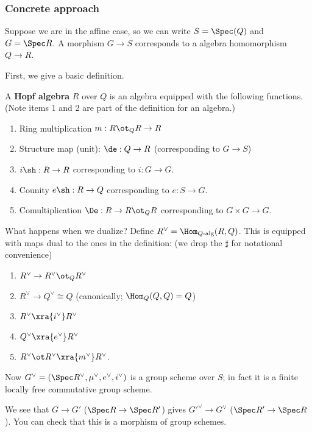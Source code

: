 \subsubsection{Concrete approach}
Suppose we are in the affine case, so we can write $S=\Spec(Q)$ and $G=\Spec R$. A morphism $G\to S$ corresponds to a algebra homomorphism $Q\to R$.

First, we give a basic definition.
\begin{df}
A \textbf{Hopf algebra}  $R$ over $Q$ is an algebra equipped with the following functions. (Note items 1 and 2 are part of the definition for an algebra.)
\begin{enumerate}
\item
Ring multiplication $m:R\ot_Q R\to R$
\item
Structure map (unit): $\de:Q\to R$ (corresponding to $G\to S$)
\item $i\sh: R\to R$ corresponding to $i:G\to G$.
\item Counity $e\sh: R\to Q$ corresponding to $e:S \to G$.
\item Comultiplication $\De:R\to R\ot_Q R$ corresponding to $G\times G\to G$.
\end{enumerate}
\end{df}
What happens when we dualize? Define $R^{\vee}=\Hom_{Q\text{-alg}}(R,Q)$. This is equipped with maps dual to the ones in the definition: (we drop the $\sharp$ for notational convenience)
\begin{enumerate}
\item $R^{\vee}\to R^{\vee}\ot_QR^{\vee}$
\item $R^{\vee}\to Q^{\vee}\cong Q$ (canonically; $\Hom_Q(Q,Q)=Q$)
\item $R^{\vee}\xra{i^{\vee}} R^{\vee}$
\item $Q^{\vee}\xra{e^{\vee}} R^{\vee}$
\item $R^{\vee}\ot R^{\vee}\xra{m^{\vee}} R^{\vee}$.
\end{enumerate}
Now $G^{\vee}=(\Spec R^{\vee}, \mu^{\vee}, e^{\vee},i^{\vee})$ is a group scheme over $S$; in fact it is a finite locally free commutative group scheme. 

We see that $G\to G'$ ($\Spec R\to \Spec R'$) gives $G'^{\vee}\to G^{\vee}$ ($\Spec R'\to \Spec R$). You can check that this is a morphism of group schemes.\\

\vskip0.15in

